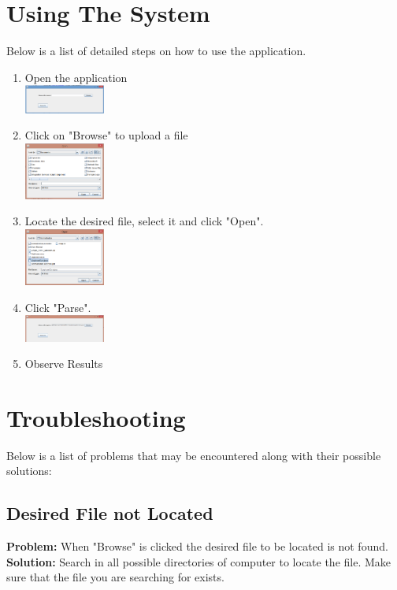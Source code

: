 \documentclass[11pt]{article}
\begin{document}
\section{Using The System}
Below is a list of detailed steps on how to use the application.
\begin{enumerate}
\item Open the application\\
\includegraphics[width=100px]{images/home.png}
\item Click on "Browse" to upload a file\\
\includegraphics[width=100px]{images/browse.png}
\item Locate the desired file, select it and click "Open".\\
\includegraphics[width=100px]{images/select.png}
\item Click "Parse".\\
\includegraphics[width=100px]{images/parse.png}
\item Observe Results
\end{enumerate}


\section{Troubleshooting}
Below is a list of problems that may be encountered along with their possible solutions:
\subsection{Desired File not Located}
\textbf{Problem:} When "Browse" is clicked the desired file to be located is not found. \\
\textbf{Solution: } Search in all possible directories of computer to locate the file. Make sure that the file you are searching for exists. \\
\end{document}

